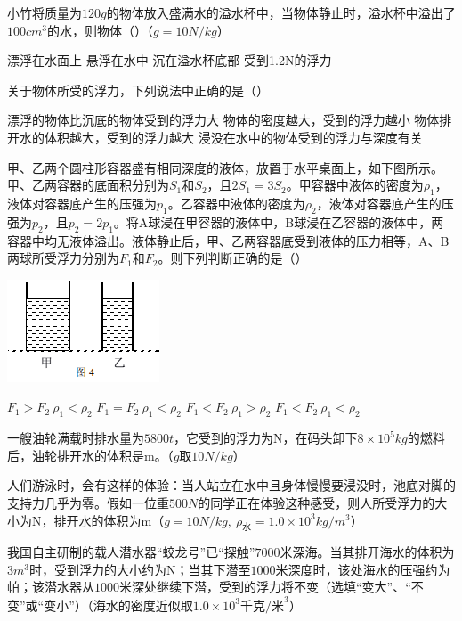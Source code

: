 \documentclass[12pt,twoside]{exam}
\begin{document}
\begin{knowledge}
\begin{questions}
\question
小竹将质量为$120g$的物体放入盛满水的溢水杯中，当物体静止时，溢水杯中溢出了$100cm^3$的水，则物体（\answerline*[C]）（$g=10N/kg$）
\begin{choices}
\choice 漂浮在水面上
\choice 悬浮在水中
\choice 沉在溢水杯底部
\choice 受到1.2N的浮力
\end{choices}


\question
关于物体所受的浮力，下列说法中正确的是（\answerline*[C]）
\begin{choices}
\choice 漂浮的物体比沉底的物体受到的浮力大
\choice 物体的密度越大，受到的浮力越小
\choice 物体排开水的体积越大，受到的浮力越大
\choice 浸没在水中的物体受到的浮力与深度有关
\end{choices}           


\question
{}
甲、乙两个圆柱形容器盛有相同深度的液体，放置于水平桌面上，如下图所示。甲、乙两容器的底面积分别为$S_1$和$S_2$，且$2S_1=3S_2$。甲容器中液体的密度为$\rho _1$，液体对容器底产生的压强为$p_1$。乙容器中液体的密度为$\rho _2$，液体对容器底产生的压强为$p_2$，且$p_2=2p_1$。将A球浸在甲容器的液体中，B球浸在乙容器的液体中，两容器中均无液体溢出。液体静止后，甲、乙两容器底受到液体的压力相等，A、B两球所受浮力分别为$F_1$和$F_2$。则下列判断正确的是（\answerline*[A]）
\begin{multicols}{2}
\includegraphics[scale=1]{figures/图片19.png} 
\columnbreak
\begin{choices}
\choice $F_1>F_2 \: \rho _1 < \rho _2$
\choice $F_1=F_2 \: \rho _1 < \rho _2$
\choice $F_1<F_2 \: \rho _1 > \rho _2$
\choice $F_1<F_2 \: \rho _1 < \rho _2$
\end{choices}
\end{multicols}


\question
一艘油轮满载时排水量为$5800t$，它受到的浮力为\answerline*[$5.8\times 10^7$]N，在码头卸下$8 \times 10^5kg$的燃料后，油轮排开水的体积是\answerline*[$5\times 10^3$]m。（$g\textrm{取}10N/kg$）


\question
人们游泳时，会有这样的体验：当人站立在水中且身体慢慢要浸没时，池底对脚的支持力几乎为零。假如一位重$500N$的同学正在体验这种感受，则人所受浮力的大小为\answerline*[500]N，排开水的体积为\answerline*[0.05]m（$g=10N/kg , \: \rho _\textrm{水}=1.0\times 10^3 kg/m^3$）
　　　

\question
我国自主研制的载人潜水器“蛟龙号”已“探触”$7000$米深海。当其排开海水的体积为$3m^3$时，受到浮力的大小约为N；当其下潜至$1000$米深度时，该处海水的压强约为\answerline*[$9.8\times 10^6$]帕；该潜水器从$1000$米深处继续下潜，受到的浮力将不变（选填“变大”、“不变”或“变小”）（海水的密度近似取$1.0\times 10^3 \textrm{千克}/\textrm{米}^3$）


\end{questions}


\end{knowledge}
\end{document}
